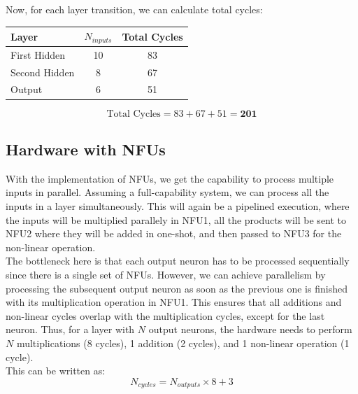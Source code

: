 \documentclass{article}
\begin{document}
Now, for each layer transition, we can calculate total cycles:

\begin{table}[H]
    \centering
    \begin{tabular}{|l|c|c|}
        \hline
        \textbf{Layer} & \textbf{$N_{inputs}$} & \textbf{Total Cycles} \\
        \hline
        First Hidden & 10 & 83 \\
        \hline
        Second Hidden & 8 & 67 \\
        \hline
        Output & 6 & 51 \\
        \hline
    \end{tabular}
    \label{tab:naive-cycles}
\end{table}

\begin{equation}
    \text{Total Cycles} = 83 + 67 + 51 = \textbf{201}
\end{equation}

\subsection{Hardware with NFUs}

With the implementation of NFUs, we get the capability to process multiple inputs in parallel. Assuming a full-capability system, we can process all the inputs in a layer simultaneously. This will again be a pipelined execution, where the inputs will be multiplied parallely in NFU1, all the products will be sent to NFU2 where they will be added in one-shot, and then passed to NFU3 for the non-linear operation.\\

The bottleneck here is that each output neuron has to be processed sequentially since there is a single set of NFUs. However, we can achieve parallelism by processing the subsequent output neuron as soon as the previous one is finished with its multiplication operation in NFU1. This ensures that all additions and non-linear cycles overlap with the multiplication cycles, except for the last neuron. Thus, for a layer with $N$ output neurons, the hardware needs to perform  $N$ multiplications (8 cycles), 1 addition (2 cycles), and 1 non-linear operation (1 cycle).\\

This can be written as:
\begin{equation}
    N_{cycles} = N_{outputs} \times 8 + 3
\end{equation}
\end{document}
